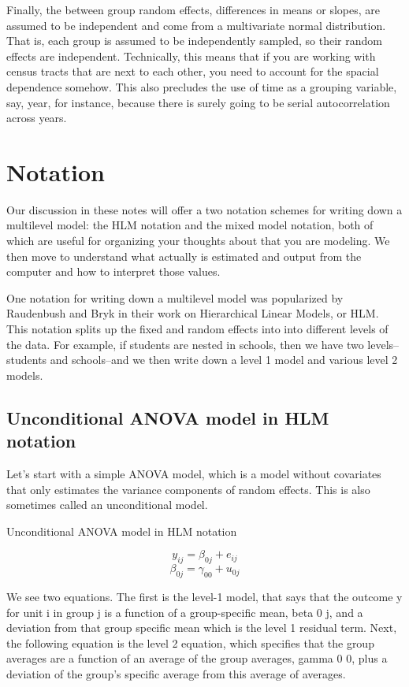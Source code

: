 Finally, the between group random effects, differences in means or slopes, are assumed to be independent and come from a multivariate normal distribution. That is, each group is assumed to be independently sampled, so their random effects are independent. Technically, this means that if you are working with census tracts that are next to each other, you need to account for the spacial dependence somehow. This also precludes the use of time as a grouping variable, say, year, for instance, because there is surely going to be serial autocorrelation across years.

\section{Notation}

Our discussion in these notes will offer a two notation schemes for writing down a multilevel model: the HLM notation and the mixed model notation, both of which are useful for organizing your thoughts about that you are modeling. We then move to understand what actually is estimated and output from the computer and how to interpret those values.

One notation for writing down a multilevel model was popularized by Raudenbush and Bryk in their work on Hierarchical Linear Models, or HLM. This notation splits up the fixed and random effects into into different levels of the data.  For example, if students are nested in schools, then we have two levels--students and schools--and we then write down a level 1 model and various level 2 models.

\subsection{Unconditional ANOVA model in HLM notation}

Let's start with a simple ANOVA model, which is a model without covariates that only estimates the variance components of random effects. This is also sometimes called an unconditional model.

Unconditional ANOVA model in HLM notation

\[
y_{ij} = \beta_{0j}+e_{ij}
\]
\[
\beta_{0j} = \gamma_{00}+u_{0j}
\]

We see two equations. The first is the level-1 model, that says that the outcome y for unit i in group j is a function of a group-specific mean, beta 0 j, and a deviation from that group specific mean which is the level 1 residual term. Next, the following equation is the level 2 equation, which specifies that the group averages are a function of an average of the group averages, gamma 0 0, plus a deviation of the group's specific average from this average of averages.

